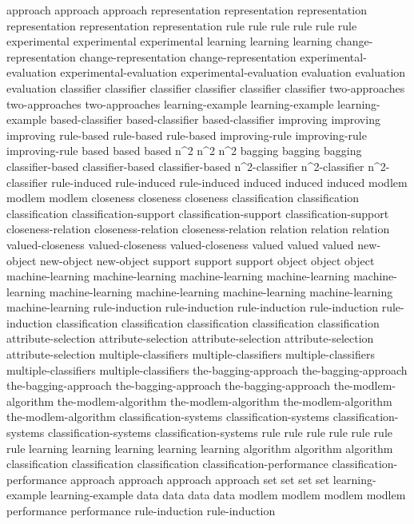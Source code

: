 approach	approach	approach	
representation	representation	representation	representation	representation	representation	
rule	rule	rule	rule	rule	rule	
experimental	experimental	experimental	
learning	learning	learning	
change-representation	change-representation	change-representation	
experimental-evaluation	experimental-evaluation	experimental-evaluation	
evaluation	evaluation	evaluation	
classifier	classifier	classifier	classifier	classifier	classifier	
two-approaches	two-approaches	two-approaches	
learning-example	learning-example	learning-example	
based-classifier	based-classifier	based-classifier	
improving	improving	improving	
rule-based	rule-based	rule-based	
improving-rule	improving-rule	improving-rule	
based	based	based	
n^2	n^2	n^2	
bagging	bagging	bagging	
classifier-based	classifier-based	classifier-based	
n^2-classifier	n^2-classifier	n^2-classifier	
rule-induced	rule-induced	rule-induced	
induced	induced	induced	
modlem	modlem	modlem	
closeness	closeness	closeness	
classification	classification	classification	
classification-support	classification-support	classification-support	
closeness-relation	closeness-relation	closeness-relation	
relation	relation	relation	
valued-closeness	valued-closeness	valued-closeness	
valued	valued	valued	
new-object	new-object	new-object	
support	support	support	
object	object	object	
machine-learning	machine-learning	machine-learning	machine-learning	machine-learning	machine-learning	machine-learning	machine-learning	machine-learning	machine-learning	
rule-induction	rule-induction	rule-induction	rule-induction	rule-induction	
classification	classification	classification	classification	classification	
attribute-selection	attribute-selection	attribute-selection	attribute-selection	attribute-selection	
multiple-classifiers	multiple-classifiers	multiple-classifiers	multiple-classifiers	multiple-classifiers	
the-bagging-approach	the-bagging-approach	the-bagging-approach	the-bagging-approach	the-bagging-approach	
the-modlem-algorithm	the-modlem-algorithm	the-modlem-algorithm	the-modlem-algorithm	the-modlem-algorithm	
classification-systems	classification-systems	classification-systems	classification-systems	classification-systems	
rule	rule	rule	rule	rule	rule	rule	
learning	learning	learning	learning	learning	
algorithm	algorithm	algorithm	
classification	classification	classification	
classification-performance	classification-performance	
approach	approach	approach	approach	
set	set	set	set	
learning-example	learning-example	
data	data	data	data	
modlem	modlem	modlem	modlem	
performance	performance	
rule-induction	rule-induction	
